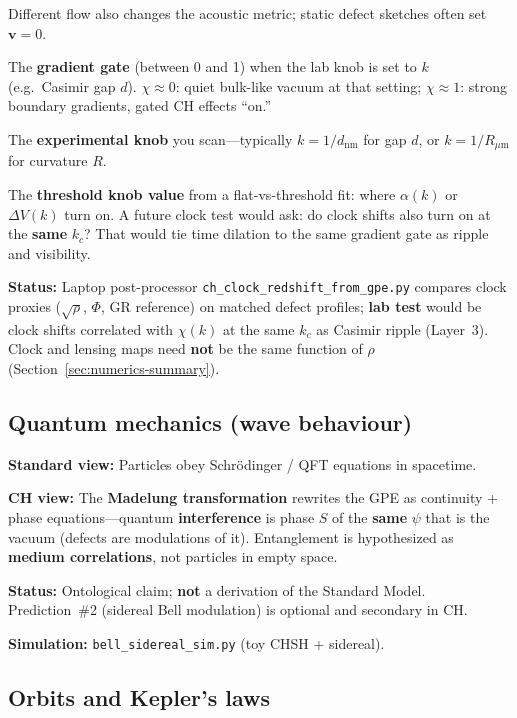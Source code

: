 \documentclass[11pt,a4paper]{article}
\begin{document}
\begin{description}[style=nextline, leftmargin=1.5em]
    Different flow also changes the acoustic metric; static defect sketches often set $\mathbf{v}=0$.
  \item[$\chi(k)$]
    The \textbf{gradient gate} (between 0 and 1) when the lab knob is set to $k$ (e.g.\ Casimir gap $d$).
    $\chi \approx 0$: quiet bulk-like vacuum at that setting; $\chi \approx 1$: strong boundary gradients, gated CH effects ``on.''
  \item[$k$]
    The \textbf{experimental knob} you scan---typically $k = 1/d_{\mathrm{nm}}$ for gap $d$, or $k = 1/R_{\mu\mathrm{m}}$ for curvature $R$.
  \item[$k_c$]
    The \textbf{threshold knob value} from a flat-vs-threshold fit: where $\alpha(k)$ or $\Delta V(k)$ turn on.
    A future clock test would ask: do clock shifts also turn on at the \textbf{same} $k_c$? That would tie time dilation to the same gradient gate as ripple and visibility.
\end{description}

\textbf{Status:} Laptop post-processor \texttt{ch\_clock\_redshift\_from\_gpe.py} compares clock proxies ($\sqrt{\rho}$, $\Phi$, GR reference) on matched defect profiles; \textbf{lab test} would be clock shifts correlated with $\chi(k)$ at the same $k_c$ as Casimir ripple (Layer~3).
Clock and lensing maps need \textbf{not} be the same function of $\rho$ (Section~\ref{sec:numerics-summary}).

\subsection{Quantum mechanics (wave behaviour)}

\textbf{Standard view:} Particles obey Schr\"odinger / QFT equations in spacetime.

\textbf{CH view:} The \textbf{Madelung transformation} rewrites the GPE as continuity + phase equations---quantum \textbf{interference} is phase $S$ of the \textbf{same} $\psi$ that is the vacuum (defects are modulations of it).
Entanglement is hypothesized as \textbf{medium correlations}, not particles in empty space.

\textbf{Status:} Ontological claim; \textbf{not} a derivation of the Standard Model.
Prediction~\#2 (sidereal Bell modulation) is optional and secondary in CH.

\textbf{Simulation:} \texttt{bell\_sidereal\_sim.py} (toy CHSH + sidereal).

\subsection{Orbits and Kepler's laws}
\end{document}
